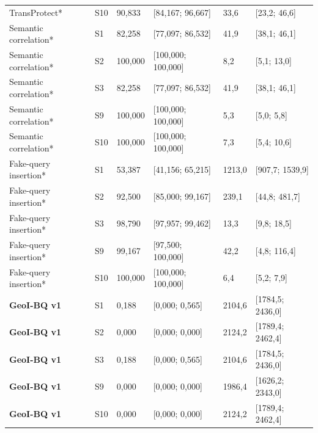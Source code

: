 \begin{longtable}{@{}P{3.4cm}P{.7cm}P{2.624cm}P{2.624cm}P{2.624cm}P{2.624cm}@{}}
TransProtect* & S10 & 90{,}833 & [84{,}167; 96{,}667] & 33{,}6 & [23{,}2; 46{,}6] \\
Semantic correlation* & S1 & 82{,}258 & [77{,}097; 86{,}532] & 41{,}9 & [38{,}1; 46{,}1] \\
Semantic correlation* & S2 & 100{,}000 & [100{,}000; 100{,}000] & 8{,}2 & [5{,}1; 13{,}0] \\
Semantic correlation* & S3 & 82{,}258 & [77{,}097; 86{,}532] & 41{,}9 & [38{,}1; 46{,}1] \\
Semantic correlation* & S9 & 100{,}000 & [100{,}000; 100{,}000] & 5{,}3 & [5{,}0; 5{,}8] \\
Semantic correlation* & S10 & 100{,}000 & [100{,}000; 100{,}000] & 7{,}3 & [5{,}4; 10{,}6] \\
Fake-query insertion* & S1 & 53{,}387 & [41{,}156; 65{,}215] & 1213{,}0 & [907{,}7; 1539{,}9] \\
Fake-query insertion* & S2 & 92{,}500 & [85{,}000; 99{,}167] & 239{,}1 & [44{,}8; 481{,}7] \\
Fake-query insertion* & S3 & 98{,}790 & [97{,}957; 99{,}462] & 13{,}3 & [9{,}8; 18{,}5] \\
Fake-query insertion* & S9 & 99{,}167 & [97{,}500; 100{,}000] & 42{,}2 & [4{,}8; 116{,}4] \\
Fake-query insertion* & S10 & 100{,}000 & [100{,}000; 100{,}000] & 6{,}4 & [5{,}2; 7{,}9] \\
\textbf{GeoI-BQ v1} & S1 & 0{,}188 & [0{,}000; 0{,}565] & 2104{,}6 & [1784{,}5; 2436{,}0] \\
\textbf{GeoI-BQ v1} & S2 & 0{,}000 & [0{,}000; 0{,}000] & 2124{,}2 & [1789{,}4; 2462{,}4] \\
\textbf{GeoI-BQ v1} & S3 & 0{,}188 & [0{,}000; 0{,}565] & 2104{,}6 & [1784{,}5; 2436{,}0] \\
\textbf{GeoI-BQ v1} & S9 & 0{,}000 & [0{,}000; 0{,}000] & 1986{,}4 & [1626{,}2; 2343{,}0] \\
\textbf{GeoI-BQ v1} & S10 & 0{,}000 & [0{,}000; 0{,}000] & 2124{,}2 & [1789{,}4; 2462{,}4] \\
\end{longtable}\endgroup\par

